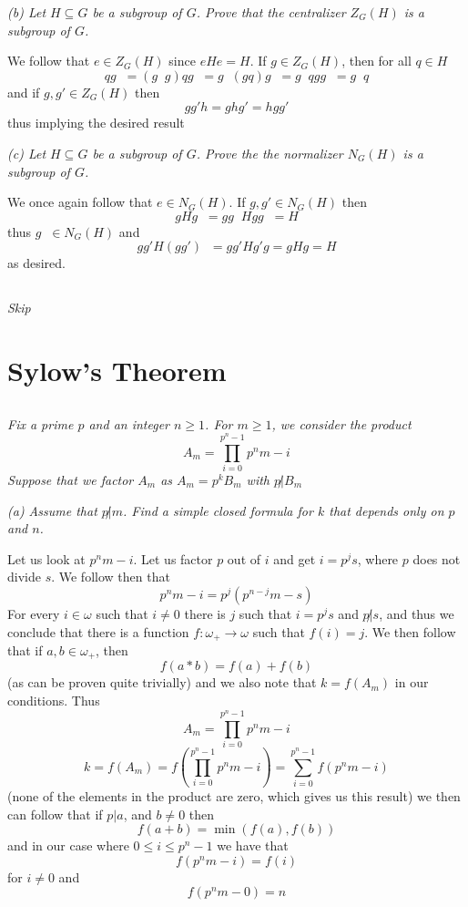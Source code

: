 \documentclass[11pt,oneside,titlepage]{book}
\DeclareMathOperator \inv {^{-1}}
\begin{document}
\textit{(b) Let $H \subseteq G$ be a subgroup of $G$. Prove that
  the centralizer $Z_G(H)$ is a subgroup of $G$. }

We follow that $e \in Z_G(H)$ since $eHe = H$. If $g \in Z_G(H)$, then
for all $q \in H$
$$q g\inv = (g\inv g )q g\inv = g\inv (g q) g\inv = g\inv qg  g\inv = g\inv q$$
and if $g, g' \in Z_G(H)$ then
$$gg'h = ghg' = hgg'$$
thus implying the desired result

\textit{(c) Let $H \subseteq G$ be a subgroup of $G$.  Prove the the
  normalizer $N_G(H)$ is a subgroup of $G$.}

We once again follow that $e \in N_G(H)$. If $g, g' \in N_G(H)$ then
$$g H g\inv = g g\inv H g g\inv = H$$
thus $g\inv \in N_G(H)$ and
$$g g' H (g g') \inv = g g' H g' g = g H g = H$$
as desired.

\subsection{}

\textit{Skip}

\section{Sylow's Theorem}

\subsection{}

\textit{Fix a prime $p$ and an integer $n \geq 1$. For $m \geq 1$, we
  consider the product
  $$A_m = \prod_{i = 0}^{p^n - 1}{p^nm - i}$$
  Suppose that we factor $A_m$ as $A_m = p^kB_m$ with $p \not | B_m$
}

\textit{(a) Assume that $p \not | m$. Find a simple closed formula for $k$ that depends
  only on $p$ and $n$.}

Let us look at $p^nm - i$. Let us factor $p$ out of $i$
and get $i = p^js$, where $p$ does not divide $s$. We follow then that
$$p^nm - i = p^j(p^{n - j}m - s)$$
For every $i \in \omega$ such that $i \neq 0$ there is $j$ such that
$i = p^js$ and $p \not | s$,
and thus we conclude that there is a function $f: \omega_+ \to \omega$
such that $f(i) = j$. We then follow that if $a, b \in \omega_+$, then
$$f(a * b) = f(a) + f(b)$$
(as can be proven quite trivially) and we also note that $k = f(A_m)$
in our conditions. Thus
$$A_m = \prod_{i = 0}^{p^n - 1}{p^nm - i}$$
$$k = f(A_m) = f(\prod_{i = 0}^{p^n - 1}{p^nm - i}) = \sum_{i = 0}^{p^n - 1}{f(p^nm - i)}$$
(none of the elements in the product are zero, which gives us this
result) we then can follow that if $p | a$, and $b \neq 0$ then
$$f(a + b) = \min(f(a), f(b))$$
and in our case where $0 \leq i \leq p^n - 1$ we have that
$$f(p^nm - i) = f(i)$$
for $i \neq 0$ and
$$f(p^nm - 0) = n$$
\end{document}
